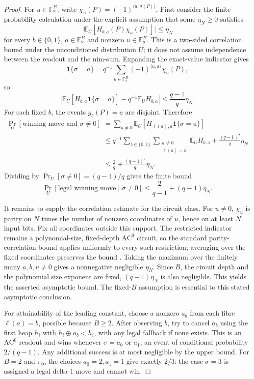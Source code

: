 \documentclass[11pt]{article}
\newcommand{\AC}{\mathrm{AC}}
\theoremstyle{plain}
\theoremstyle{definition}
\theoremstyle{remark}
\numberwithin{equation}{section}
\begin{document}
\begin{proof}
For $u\in\mathbb F_2^B$, write $\chi_u(P)=(-1)^{\langle u,\sigma(P)\rangle}$. First consider the finite probability calculation under the explicit assumption that some $\eta_N\ge0$ satisfies
\[
\bigl|\mathbb E_U[H_{b,a}(P)\chi_u(P)]\bigr|
\le \eta_N
\]
for every $b\in\{0,1\}$, $a\in\mathbb F_2^B$ and nonzero $u\in\mathbb F_2^B$. This is a two-sided correlation bound under the unconditioned distribution $U$; it does not assume independence between the readout and the nim-sum.
Expanding the exact-value indicator gives
\[
\mathbf1\{\sigma=a\}=q^{-1}\sum_{u\in\mathbb F_2^B}
(-1)^{\langle u,a\rangle}\chi_u(P),
\]
so
\[
\left|\mathbb E_U[H_{b,a}\mathbf1\{\sigma=a\}]
-q^{-1}\mathbb E_U H_{b,a}\right|
\le \frac{q-1}{q}\eta_N.
\]
For each fixed $b$, the events $g_b(P)=a$ are disjoint. Therefore
\begin{align*}
\Pr_U[\text{winning move and }\sigma\ne0]
&=\sum_{a\ne0}\mathbb E_U[H_{\ell(a),a}\mathbf1\{\sigma=a\}]\\
&\le q^{-1}\sum_{b\in\{0,1\}}\sum_{\substack{a\ne0\\\ell(a)=b}}
\mathbb E_U H_{b,a}+\frac{(q-1)^2}{q}\eta_N\\
&\le \frac{2}{q}+\frac{(q-1)^2}{q}\eta_N.
\end{align*}
Dividing by $\Pr_U[\sigma\ne0]=(q-1)/q$ gives the finite bound
\begin{equation}
\Pr_U[\text{legal winning move}\mid\sigma\ne0]
\le \frac{2}{q-1}+(q-1)\eta_N.
\label{eq:finite-correlation-bound}
\end{equation}

It remains to supply the correlation estimate for the circuit class. For $u\ne0$, $\chi_u$ is parity on $N$ times the number of nonzero coordinates of $u$, hence on at least $N$ input bits. Fix all coordinates outside this support. The restricted indicator remains a polynomial-size, fixed-depth $\AC^0$ circuit, so the standard parity-correlation bound applies uniformly to every such restriction; averaging over the fixed coordinates preserves the bound \cite{hastad1986thesis,hastad2014correlation}. Taking the maximum over the finitely many $a,b,u\ne0$ gives a nonnegative negligible $\eta_N$. Since $B$, the circuit depth and the polynomial size exponent are fixed, $(q-1)\eta_N$ is also negligible. This yields the asserted asymptotic bound. The fixed-$B$ assumption is essential to this stated asymptotic conclusion.

For attainability of the leading constant, choose a nonzero $a_b$ from each fibre $\ell(a)=b$, possible because $B\ge2$. After observing $b$, try to cancel $a_b$ using the first heap $h_i$ with $h_i\oplus a_b<h_i$, with any legal fallback if none exists. This is an $\AC^0$ readout and wins whenever $\sigma=a_0$ or $a_1$, an event of conditional probability $2/(q-1)$. Any additional success is at most negligible by the upper bound. For $B=2$ and $\pi_0$, the choices $a_0=2,a_1=1$ give exactly $2/3$: the case $\sigma=3$ is assigned a legal delta-1 move and cannot win.


\end{proof}
\end{document}
